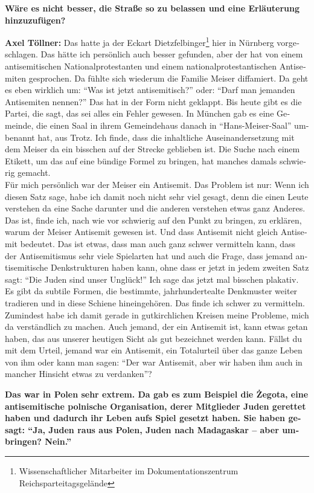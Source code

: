 \begin{otherlanguage}{ngerman}
\textbf{Wäre es nicht besser, die Straße so zu belassen und eine Erläuterung hinzuzufügen?} 

\textbf{Axel Töllner:} Das hatte ja der Eckart Dietzfelbinger\footnote{Wissenschaftlicher Mitarbeiter im Dokumentationszentrum Reichsparteitagsgelände} hier in Nürnberg vorgeschlagen. Das hätte ich persönlich auch besser gefunden, aber der hat von einem antisemitischen Nationalprotestanten und einem nationalprotestantischen Antisemiten gesprochen. Da fühlte sich wiederum die Familie Meiser diffamiert. Da geht es eben wirklich um: "`Was ist jetzt antisemitisch?"' oder: "`Darf man jemanden Antisemiten nennen?"' Das hat in der Form nicht geklappt. Bis heute gibt es die Partei, die sagt, das sei alles ein Fehler gewesen. In München gab es eine Gemeinde, die einen Saal in ihrem Gemeindehaus danach in "`Hans-Meiser-Saal"' umbenannt hat, aus Trotz. Ich finde, dass die inhaltliche Auseinandersetzung mit dem Meiser da ein bisschen auf der Strecke geblieben ist. Die Suche nach einem Etikett, um das auf eine bündige Formel zu bringen, hat manches damals schwierig gemacht. \\
Für mich persönlich war der Meiser ein Antisemit. Das Problem ist nur: Wenn ich diesen Satz sage, habe ich damit noch nicht sehr viel gesagt, denn die einen Leute verstehen da eine Sache darunter und die anderen verstehen etwas ganz Anderes. Das ist, finde ich, nach wie vor schwierig auf den Punkt zu bringen, zu erklären, warum der Meiser Antisemit gewesen ist. Und dass Antisemit nicht gleich Antisemit bedeutet. Das ist etwas, dass man auch ganz schwer vermitteln kann, dass der Antisemitismus sehr viele Spielarten hat und auch die Frage, dass jemand antisemitische Denkstrukturen haben kann, ohne dass er jetzt in jedem zweiten Satz sagt: "`Die Juden sind unser Unglück!"' Ich sage das jetzt mal bisschen plakativ. Es gibt da subtile Formen, die bestimmte, jahrhundertealte Denkmuster weiter tradieren und in diese Schiene hineingehören. Das finde ich schwer zu vermitteln. Zumindest habe ich damit gerade in gutkirchlichen Kreisen meine Probleme, mich da verständlich zu machen. Auch jemand, der ein Antisemit ist, kann etwas getan haben, das aus unserer heutigen Sicht als gut bezeichnet werden kann. Fällst du mit dem Urteil, jemand war ein Antisemit, ein Totalurteil über das ganze Leben von ihm oder kann man sagen: "`Der war Antisemit, aber wir haben ihm auch in mancher Hinsicht etwas zu verdanken"'? 
 
\textbf{Das war in Polen sehr extrem. Da gab es zum Beispiel die Żegota, eine antisemitische polnische Organisation, derer Mitglieder Juden gerettet haben und dadurch ihr Leben aufs Spiel gesetzt haben. Sie haben gesagt: "`Ja, Juden raus aus Polen, Juden nach Madagaskar – aber umbringen? Nein."'} 


\end{otherlanguage}
